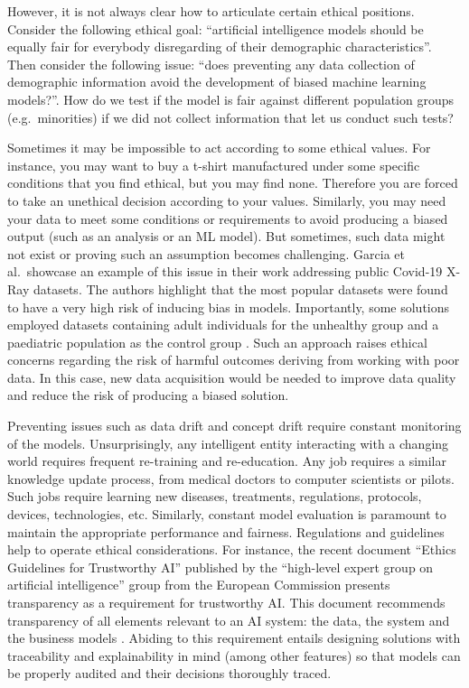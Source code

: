 \documentclass[
]{book}
\begin{document}
However, it is not always clear how to articulate certain ethical positions. Consider the following ethical goal: ``artificial intelligence models should be equally fair for everybody disregarding of their demographic characteristics''. Then consider the following issue: ``does preventing any data collection of demographic information avoid the development of biased machine learning models?''. How do we test if the model is fair against different population groups (e.g.~minorities) if we did not collect information that let us conduct such tests?

Sometimes it may be impossible to act according to some ethical values. For instance, you may want to buy a t-shirt manufactured under some specific conditions that you find ethical, but you may find none. Therefore you are forced to take an unethical decision according to your values. Similarly, you may need your data to meet some conditions or requirements to avoid producing a biased output (such as an analysis or an ML model). But sometimes, such data might not exist or proving such an assumption becomes challenging. Garcia et al.~showcase an example of this issue in their work addressing public Covid-19 X-Ray datasets. The authors highlight that the most popular datasets were found to have a very high risk of inducing bias in models. Importantly, some solutions employed datasets containing adult individuals for the unhealthy group and a paediatric population as the control group \citep{santa2021public}. Such an approach raises ethical concerns regarding the risk of harmful outcomes deriving from working with poor data. In this case, new data acquisition would be needed to improve data quality and reduce the risk of producing a biased solution.

Preventing issues such as data drift and concept drift require constant monitoring of the models. Unsurprisingly, any intelligent entity interacting with a changing world requires frequent re-training and re-education. Any job requires a similar knowledge update process, from medical doctors to computer scientists or pilots. Such jobs require learning new diseases, treatments, regulations, protocols, devices, technologies, etc. Similarly, constant model evaluation is paramount to maintain the appropriate performance and fairness. Regulations and guidelines help to operate ethical considerations. For instance, the recent document ``Ethics Guidelines for Trustworthy AI'' published by the ``high-level expert group on artificial intelligence'' group from the European Commission presents transparency as a requirement for trustworthy AI. This document recommends transparency of all elements relevant to an AI system: the data, the system and the business models \citep{ai2019high}. Abiding to this requirement entails designing solutions with traceability and explainability in mind (among other features) so that models can be properly audited and their decisions thoroughly traced.
\end{document}
